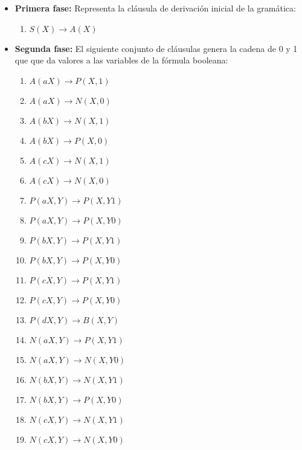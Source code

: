 \begin{itemize}
    \item \textbf{Primera fase:} Representa la cláusula de derivación inicial de la gramática:
          \begin{enumerate}
              \item $S(X)\to A(X)$
          \end{enumerate}

    \item \textbf{Segunda fase:} El siguiente conjunto de cláusulas genera la cadena de 0 y 1 que que da valores a las variables de la
          fórmula booleana:
          \begin{multicols}{2}
              \begin{enumerate}[start=2]
                  \item $A(aX)\to P(X,1)$
                  \item $A(aX)\to N(X,0)$
                  \item $A(bX)\to N(X,1)$
                  \item $A(bX)\to P(X,0)$
                  \item $A(cX)\to N(X,1)$
                  \item $A(cX)\to N(X,0)$

                  \item $P(aX,Y)\to P(X,Y1)$
                  \item $P(aX,Y)\to P(X,Y0)$
                  \item $P(bX,Y)\to P(X,Y1)$
                  \item $P(bX,Y)\to P(X,Y0)$
                  \item $P(cX,Y)\to P(X,Y1)$
                  \item $P(cX,Y)\to P(X,Y0)$
                  \item $P(dX,Y)\to B(X,Y)$

                  \item $N(aX,Y)\to P(X,Y1)$
                  \item $N(aX,Y)\to N(X,Y0)$
                  \item $N(bX,Y)\to N(X,Y1)$
                  \item $N(bX,Y)\to P(X,Y0)$
                  \item $N(cX,Y)\to N(X,Y1)$
                  \item $N(cX,Y)\to N(X,Y0)$
              \end{enumerate}
          \end{multicols}


\end{itemize}
